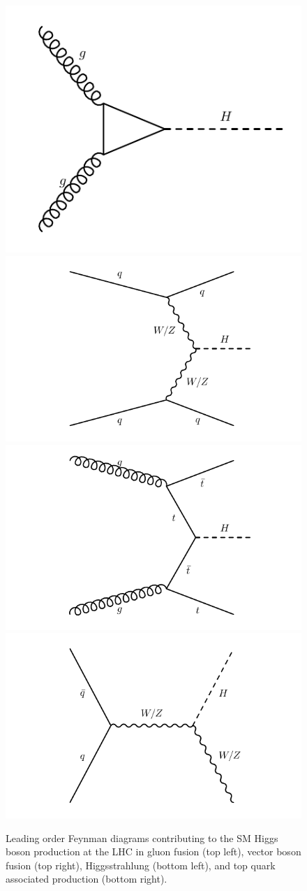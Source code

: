 \begin{figure}[h]
\centering
\includegraphics[width=0.49\columnwidth]{figures_chapter2/g_fusion}
\includegraphics[width=0.49\columnwidth]{figures_chapter2/vbf}
\includegraphics[width=0.49\columnwidth]{figures_chapter2/tth}
\includegraphics[width=0.49\columnwidth]{figures_chapter2/vh}
\caption{Leading order Feynman diagrams contributing to the SM Higgs boson production at the LHC in gluon fusion (top left), vector boson fusion (top right), Higgsstrahlung (bottom left), and top quark associated production (bottom right). }
\label{fig:sm_higgs}
\end{figure} 

